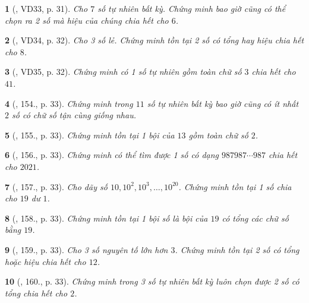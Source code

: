 \documentclass{article}
\newtheorem{baitoan}{}
\begin{document}
\begin{baitoan}[\cite{Tuyen_Toan_6}, VD33, p. 31]
	Cho $7$ số tự nhiên bất kỳ. Chứng minh bao giờ cũng có thể chọn ra 2 số mà hiệu của chúng chia hết cho $6$.
\end{baitoan}

\begin{baitoan}[\cite{Tuyen_Toan_6}, VD34, p. 32]
	Cho 3 số lẻ. Chứng minh tồn tại 2 số có tổng hay hiệu chia hết cho $8$.
\end{baitoan}

\begin{baitoan}[\cite{Tuyen_Toan_6}, VD35, p. 32]
	Chứng minh có 1 số tự nhiên gồm toàn chữ số $3$ chia hết cho $41$.
\end{baitoan}

\begin{baitoan}[\cite{Tuyen_Toan_6}, 154., p. 33]
	Chứng minh trong $11$ số tự nhiên bất kỳ bao giờ cũng có ít nhất $2$ số có chữ số tận cùng giống nhau.
\end{baitoan}

\begin{baitoan}[\cite{Tuyen_Toan_6}, 155., p. 33]
	Chứng minh tồn tại 1 bội của $13$ gồm toàn chữ số $2$.
\end{baitoan}

\begin{baitoan}[\cite{Tuyen_Toan_6}, 156., p. 33]
	Chứng minh có thể tìm được 1 số có dạng $987987\cdots987$ chia hết cho $2021$.
\end{baitoan}

\begin{baitoan}[\cite{Tuyen_Toan_6}, 157., p. 33]
	Cho dãy số $10,10^2,10^3,\ldots,10^{20}$. Chứng minh tồn tại 1 số chia cho $19$ dư $1$.
\end{baitoan}

\begin{baitoan}[\cite{Tuyen_Toan_6}, 158., p. 33]
	Chứng minh tồn tại 1 bội số là bội của $19$ có tổng các chữ số bằng $19$.
\end{baitoan}

\begin{baitoan}[\cite{Tuyen_Toan_6}, 159., p. 33]
	Cho 3 số nguyên tố lớn hơn $3$. Chứng minh tồn tại 2 số có tổng hoặc hiệu chia hết cho $12$.
\end{baitoan}

\begin{baitoan}[\cite{Tuyen_Toan_6}, 160., p. 33]
	Chứng minh trong 3 số tự nhiên bất kỳ luôn chọn được 2 số có tổng chia hết cho $2$.
\end{baitoan}
\end{document}
